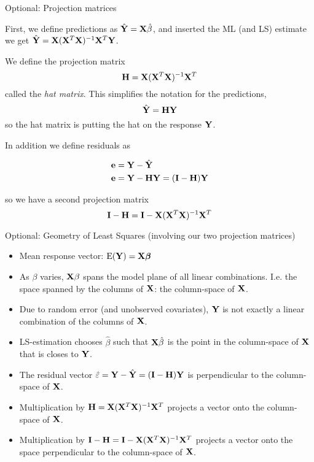 \documentclass[ignorenonframetext,]{beamer}
\providecommand{\tightlist}{%
  \setlength{\itemsep}{0pt}\setlength{\parskip}{0pt}}
\begin{document}
\begin{frame}

\begin{block}{Optional: Projection matrices}

First, we define predictions as \(\hat{\bf Y}={\bf X}\hat{\beta}\), and
inserted the ML (and LS) estimate we get
\(\hat{\bf Y}={\bf X}({\bf X}^T{\bf X})^{-1}{\bf X}^T{\bf Y}\).

We define the projection matrix
\[  {\bf H}={\bf X}({\bf X}^T{\bf X})^{-1} {\bf X}^T\] called the
\emph{hat matrix}. This simplifies the notation for the predictions,
\[\hat{\bf Y}={\bf H}{\bf Y}\] so the hat matrix is putting the hat on
the response \({\bf Y}\).

In addition we define residuals as

\begin{align*}
{\bf e}&={\bf Y}-\hat{\bf Y} \\
{\bf e}&={\bf Y}-{\bf HY}=({\bf I-H}){\bf Y}\\
\end{align*}

so we have a second projection matrix
\[ {\bf I-H}={\bf I}-{\bf X}({\bf X}^T{\bf X})^{-1} {\bf X}^T \]

\end{block}

\end{frame}

\begin{frame}

\begin{block}{Optional: Geometry of Least Squares (involving our two
projection matrices)}

\begin{itemize}
\tightlist
\item
  Mean response vector: \(\text{E}({\bf Y})={\bf X}{\boldsymbol \beta}\)
\item
  As \(\beta\) varies, \({\bf X}\beta\) spans the model plane of all
  linear combinations. I.e. the space spanned by the columns of
  \({\bf X}\): the column-space of \({\bf X}\).
\item
  Due to random error (and unobserved covariates), \({\bf Y}\) is not
  exactly a linear combination of the columns of \({\bf X}\).
\item
  LS-estimation chooses \(\hat{\beta}\) such that \({\bf X}\hat{\beta}\)
  is the point in the column-space of \({\bf X}\) that is closes to
  \({\bf Y}\).
\item
  The residual vector
  \(\hat{\varepsilon}={\bf Y}-\hat{{\bf Y}}=({\bf I-H}){\bf Y}\) is
  perpendicular to the column-space of \({\bf X}\).
\item
  Multiplication by \({\bf H}={\bf X}({\bf X}^T{\bf X})^{-1}{\bf X}^T\)
  projects a vector onto the column-space of \({\bf X}\).
\item
  Multiplication by
  \({\bf I-H}={\bf I}-{\bf X}({\bf X}^T{\bf X})^{-1}{\bf X}^T\) projects
  a vector onto the space perpendicular to the column-space of
  \({\bf X}\).
\end{itemize}

\end{block}

\end{frame}
\end{document}
